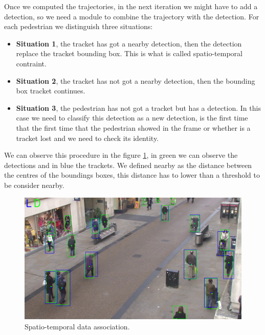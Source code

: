 \documentclass[12pt, a4paper, titlepage,twoside,openright]{article}
\begin{document}
Once we computed the trajectories, in the next iteration we might have to add a detection, so we need a module to combine the trajectory with the detection. For each pedestrian we distinguish three situations:

\begin{itemize}



\item \textbf{Situation 1}, the tracket has got a nearby detection, then the detection replace the tracket bounding box. This is what is called spatio-temporal contraint.

\item \textbf{Situation 2}, the tracket has not got a nearby detection, then the bounding box tracket continues.

\item \textbf{Situation 3}, the pedestrian has not got a tracket but has a detection. In this case we need to classify this detection as a new detection, is the first time that the first time that the pedestrian showed in the frame or whether is a tracket lost and we need to check its identity.

\end{itemize}

We can observe this procedure in the figure \ref{data1}, in green we can observe the detections and in blue the trackets. We defined nearby as the distance between the centres of the boundings boxes, this distance has to lower than a threshold to be consider nearby. 

\begin{figure}[hptb]
\centering         
\includegraphics[width=12cm]{lucasKanade/dataAssociation.jpg}
\caption{Spatio-temporal data association.} \label{data1}
\end{figure}
\end{document}
